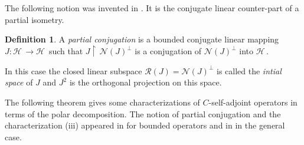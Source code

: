\documentclass[12pt]{amsart}
\newcommand{\cR}{\mathcal{R}}
\theoremstyle{definition}
\newtheorem{defn}[thm]{Definition}
\newcommand{\cH}{\mathcal{H}\,}
\newcommand{\cN}{\mathcal{N}}
\def\uphar{{\upharpoonright\,}}
\begin{document}
The following notion was invented in \cite{gp1}. It is the conjugate linear counter-part of a partial isometry.
\begin{defn}
A \emph{partial conjugation} is a bounded conjugate linear mapping $J:\cH\to\cH$  such that $J \uphar\cN(J)^\bot$ is a conjugation of $\cN(J)^\bot $ into $\cH$.
\end{defn}
In this case the closed linear subspace $\cR(J)=\cN(J)^\bot$ is called the \emph{intial space} of $J$ and $J^2$ is the orthogonal projection on this space.

The following theorem gives some characterizations of $C$-self-adjoint operators in terms of the polar decomposition.
The notion of partial conjugation and the characterization (iii)  appeared in \cite{gp1} for bounded operators and in \cite{camara} in the general case.
\end{document}
